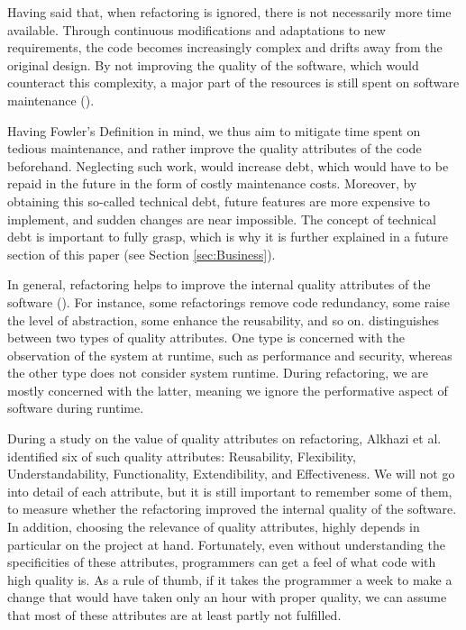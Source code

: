 Having said that, when refactoring is ignored, there is not necessarily more time available.
Through continuous modifications and adaptations to new requirements, 
	the code becomes increasingly complex and drifts away from the original design.
By not improving the quality of the software, which would counteract this complexity, 
	a major part of the resources is still spent on software maintenance (\cite[p.~1]{mens2003}). 

Having Fowler's Definition in mind, 
	we thus aim to mitigate time spent on tedious maintenance, 
	and rather improve the quality attributes of the code beforehand.
Neglecting such work, would increase debt, 
	which would have to be repaid in the future in the form of costly maintenance costs.
Moreover, by obtaining this so-called technical debt, 
	future features are more expensive to implement, and sudden changes are near impossible. 
The concept of technical debt is important to fully grasp, 
	which is why it is further explained in a future section of this paper 
(see Section \ref{sec:Business}).


In general, refactoring helps to improve the internal quality attributes of the software (\cite[p.~129]{mens2004}). 
For instance, some refactorings remove code redundancy, 
	some raise the level of abstraction, 
	some enhance the reusability, and so on.
\textcite{bass1998} distinguishes
	between two types of quality attributes. 
One type is concerned with the observation of the system at runtime, 
	such as performance and security, 
	whereas the other type does not consider  system runtime.
During refactoring, we are mostly concerned with the latter, 
	meaning we ignore the performative aspect of software during runtime.

During a study on the value of quality attributes on refactoring, 
	Alkhazi et al. \textcite[p.~4]{alkhazi2020} identified 
	six of such quality attributes: 
	Reusability, Flexibility, Understandability, 
	Functionality, Extendibility, and Effectiveness.
We will not go into detail of each attribute, 
	but it is still important to remember some of them,
   to measure whether the refactoring improved the internal quality of the software.
In addition, choosing the relevance of quality attributes,
	highly depends in particular on the project at hand.
Fortunately, even without understanding the specificities of these attributes,
	programmers can get a feel of what code with high quality is.
As a rule of thumb, 
	if it takes the programmer a week to make a change 
	that would have taken only an hour with proper quality, 
	we can assume that most of these attributes are at 
	least partly not fulfilled.

